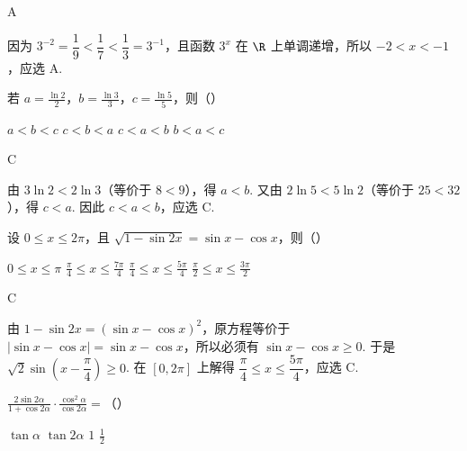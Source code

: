\begin{answer}
A
\end{answer}

\begin{solution}
因为 \(3^{-2}=\dfrac19<\dfrac17<\dfrac13=3^{-1}\)，且函数 \(3^x\) 在 \(\R\) 上单调递增，所以 \(-2<x<-1\)，应选 A.
\end{solution}



\begin{problem}
若 \(a = \frac{\ln 2}{2}\)，\(b = \frac{\ln 3}{3}\)，\(c = \frac{\ln 5}{5}\)，则（\quad）

\choices
    {\(a < b < c\)}
    {\(c < b < a\)}
    {\(c < a < b\)}
    {\(b < a < c\)}
\end{problem}

\begin{answer}
C
\end{answer}

\begin{solution}
由 \(3\ln2<2\ln3\)（等价于 \(8<9\)），得 \(a<b\). 又由 \(2\ln5<5\ln2\)（等价于 \(25<32\)），得 \(c<a\). 因此 \(c<a<b\)，应选 C.
\end{solution}



\begin{problem}
设 \(0 \leqslant x \leqslant 2\pi\)，且 \(\sqrt{1 - \sin 2x} = \sin x - \cos x\)，则（\quad）

\choices
    {\(0 \leqslant x \leqslant \pi\)}
    {\(\frac{\pi}{4} \leqslant x \leqslant \frac{7\pi}{4}\)}
    {\(\frac{\pi}{4} \leqslant x \leqslant \frac{5\pi}{4}\)}
    {\(\frac{\pi}{2} \leqslant x \leqslant \frac{3\pi}{2}\)}
\end{problem}

\begin{answer}
C
\end{answer}

\begin{solution}
由 \(1-\sin2x=(\sin x-\cos x)^2\)，原方程等价于 \(\lvert\sin x-\cos x\rvert=\sin x-\cos x\)，所以必须有 \(\sin x-\cos x\geqslant0\). 于是 \(\sqrt2\sin\left(x-\dfrac\pi4\right)\geqslant0\). 在 \([0,2\pi]\) 上解得 \(\dfrac\pi4\leqslant x\leqslant\dfrac{5\pi}{4}\)，应选 C.
\end{solution}



\begin{problem}
\(\frac{2\sin 2\alpha}{1 + \cos 2\alpha} \cdot \frac{\cos^2\alpha}{\cos 2\alpha} =\)（\quad）

\choices
    {\(\tan \alpha\)}
    {\(\tan 2\alpha\)}
    {\(1\)}
    {\(\frac{1}{2}\)}
\end{problem}

